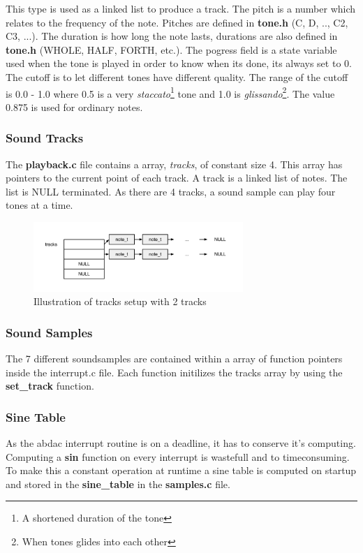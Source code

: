 This type is used as a linked list to produce a track. The pitch is a number which relates to the frequency
of the note. Pitches are defined in \textbf{tone.h} (C, D, .., C2, C3, ...). The duration is how long the note lasts, durations
are also defined in \textbf{tone.h} (WHOLE, HALF, FORTH, etc.). The pogress field is a state variable used
when the tone is played in order to know when its done, its always set to 0. The cutoff is to let different tones have different
quality. The range of the cutoff is 0.0 - 1.0 where 0.5 is a very \textit{staccato}\footnote{A shortened duration of the tone}
tone and 1.0 is \textit{glissando}\footnote{When tones glides into each other}. The value 0.875 is used
for ordinary notes.

\subsubsection{Sound Tracks}
The \textbf{playback.c} file contains a array, \textit{tracks}, of constant size 4. This array has pointers to
the current point of each track. A track is a linked list of notes. The list is NULL terminated.
As there are 4 tracks, a sound sample can play four tones at a time.
\begin{figure}[h]
  \centerline{\includegraphics[width=300px]{tracks.png}}
  \caption{Illustration of tracks setup with 2 tracks}
\end{figure}

\subsubsection{Sound Samples}
The 7 different soundsamples are contained within a array of function pointers inside the interrupt.c file.
Each function initilizes the tracks array by using the \textbf{set\_track} function.

\subsubsection{Sine Table}
As the abdac interrupt routine is on a deadline, it has to conserve it's computing. Computing a \textbf{sin}
function on every interrupt is wastefull and to timeconsuming. To make this a constant operation at runtime
a sine table is computed on startup and stored in the \textbf{sine\_table} in the \textbf{samples.c} file.

